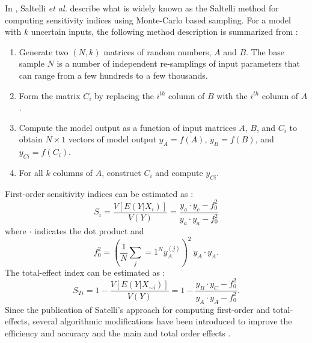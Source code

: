In \cite{saltelliGSA}, Saltelli \textit{et al.} describe what is widely known as the Saltelli method for computing sensitivity indices using Monte-Carlo based sampling. For a model with $k$ uncertain inputs, the following method description is summarized from \cite{saltelliGSA}:
\begin{enumerate}
    \item Generate two $(N,k)$ matrices of random numbers, $A$ and $B$. The base sample $N$ is a number of independent re-samplings of input parameters that can range from a few hundreds to a few thousands. 
    \item Form the matrix $C_i$ by replacing the $i^{th}$ column of $B$ with the $i^{th}$ column of $A$.
    \item Compute the model output as a function of input matrices $A$, $B$, and $C_i$ to obtain $N\times 1$ vectors of model output $y_A=f(A)$, $y_B=f(B)$, and $y_{Ci}=f(C_i)$. 
    \item For all $k$ columns of $A$, construct $C_i$ and compute $y_{Ci}$.
\end{enumerate}
First-order sensitivity indices can be estimated as \cite{saltelliGSA}:
\begin{equation}\label{eq:saltelli-si}
    S_i = \frac{V[E(Y|X_i)]}{V(Y)} = \frac{y_a \cdot y_c - f_0^2}{y_a \cdot y_a - f_0^2}
\end{equation} where $\cdot$ indicates the dot product and
\begin{equation}\label{eq:f0}
    f_0^2 = \left( \frac{1}{N} \sum_j=1^N y_A^{(j)} \right)^2 \ y_A \cdot y_A .
\end{equation}
The total-effect index can be estimated as \cite{saltelliGSA}:
\begin{equation}
    S_{Ti} = 1 - \frac{V[E(Y|X_{\sim i})]}{V(Y)} = 1 - \frac{y_B \cdot y_C - f_0^2}{y_A \cdot y_A - f_0^2}.
\end{equation}
Since the publication of Satelli's approach for computing first-order and total- effects, several algorithmic modifications have been introduced to improve the efficiency and accuracy and the main and total order effects \cite{saltelli2002, MCMC-paper}.

